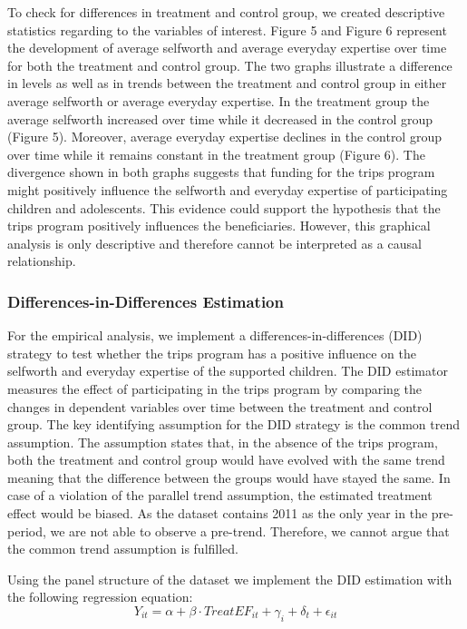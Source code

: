 \documentclass[12pt, a4paper, titlepage]{article}\usepackage[]{graphicx}\usepackage[]{color}
\begin{document}
To check for differences in treatment and control group, we created descriptive statistics regarding to the variables of interest.
Figure 5 and Figure 6 represent the development of average selfworth and average everyday expertise over time for both the treatment and control group. The two graphs illustrate a difference in levels as well as in trends between the treatment and control group in either average selfworth or average everyday expertise. In the treatment group the average selfworth increased over time  while it decreased in the control group (Figure 5). Moreover, average everyday expertise declines in the control group over time while it remains constant in the treatment group (Figure 6). The divergence shown in both graphs suggests that funding for the trips program might positively influence the selfworth and everyday expertise of participating children and adolescents. This evidence could support the hypothesis that the trips program positively influences the beneficiaries. However, this graphical analysis is only descriptive and therefore cannot be interpreted as a causal relationship.

\subsubsection{Differences-in-Differences Estimation}

For the empirical analysis, we implement a differences-in-differences (DID) strategy to test whether the trips program has a positive influence on the selfworth and everyday expertise of the supported children. The DID estimator measures the effect of participating in the trips program by comparing the changes in dependent variables over time between the treatment and control group. The key identifying assumption for the DID strategy is the common trend assumption. The assumption states that, in the absence of the trips program, both the treatment and control group would have evolved with the same trend meaning that the difference between the groups would have stayed the same. In case of a violation of the parallel trend assumption, the estimated treatment effect would be biased. As the dataset contains 2011 as the only year in the pre-period, we are not able to observe a pre-trend. Therefore, we cannot argue that the common trend assumption is fulfilled.

Using the panel structure of the dataset we implement the DID estimation with the following regression equation:
\begin{equation}
\label{didregression}
  Y_{it} = \alpha + \beta \cdot TreatEF_{it} + \gamma_{i} + \delta_{t} + \epsilon_{it}
\end{equation}
\end{document}
